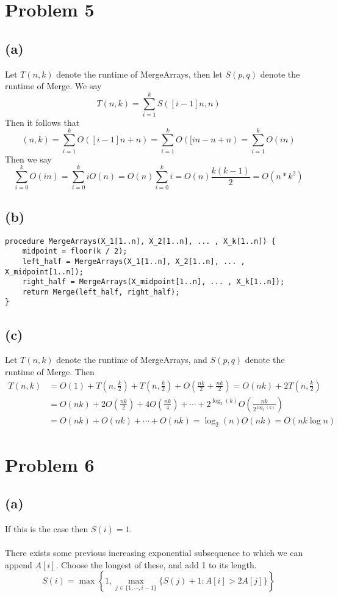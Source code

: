 \documentclass{article}
\begin{document}
\section*{Problem 5}
\subsection*{(a)}
Let $T(n,k)$ denote the runtime of MergeArrays, then let $S(p,q)$ denote the runtime of Merge.
We say
\[
    T(n,k) = \sum_{i=1}^k S([i-1]n, n)    
\]
Then it follows that 
\[
    (n,k) = \sum_{i=1}^k O([i-1]n + n) = \sum_{i=1}^k O([in- n + n) = \sum_{i=1}^k O(in) 
\] 
Then we say 
\[ 
    \sum_{i=0}^k O(in) = \sum_{i=0}^k iO(n) = O(n) \sum_{i=0}^k i = O(n) \frac{k(k-1)}{2} = O(n * k^2)
\]
\subsection*{(b)}

\begin{verbatim}
procedure MergeArrays(X_1[1..n], X_2[1..n], ... , X_k[1..n]) {
    midpoint = floor(k / 2);
    left_half = MergeArrays(X_1[1..n], X_2[1..n], ... , X_midpoint[1..n]);
    right_half = MergeArrays(X_midpoint[1..n], ... , X_k[1..n]);
    return Merge(left_half, right_half);
}
\end{verbatim}
\subsection*{(c)}
Let $T(n, k)$ denote the runtime of MergeArrays, and $S(p,q)$ denote the runtime of Merge.
Then
\begin{align*}
    T(n,k) &= O(1) + T(n, \frac{k}{2}) + T(n, \frac{k}{2}) + O(\frac{nk}{2} + \frac{nk}{2}) = O(nk) + 2T(n, \frac{k}{2})\\
    &= O(nk) + 2O(\frac{nk}{2}) + 4O(\frac{nk}{4}) + \cdots + 2^{\log_2(k)}O(\frac{nk}{2^{\log_2(k)}})\\
    &= O(nk) + O(nk) +\cdots + O(nk) = \log_2(n) O(nk) = O(nk \log n)  
\end{align*}

\section*{Problem 6}
\subsection*{(a)}
 If this is the case then $S(i) = 1$.\\\\
 There exists some previous increasing exponential subsequence to which we can append $A[i]$. Choose the longest of these, and add 1 to its length.
\[
    S(i) = \max \left\{ 1, \max_{j \in \{1,\cdots,i-1\}}\{S(j) + 1 : A[i]>2A[j]\}\right\}
\]
\end{document}
